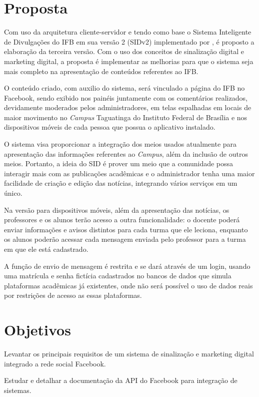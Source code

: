 \section{Proposta}
Com uso da arquitetura cliente-servidor e tendo como base o Sistema Inteligente de Divulgações do IFB em sua versão 2 (SIDv2) implementado por \citet{sobrinho2017}, é proposto a elaboração da terceira versão. Com o uso dos conceitos de sinalização digital e marketing digital, a proposta é implementar as melhorias para que o sistema seja mais completo na apresentação de conteúdos referentes ao IFB. 

O conteúdo criado, com auxilio do sistema, será vinculado a página do IFB no Facebook, sendo exibido nos painéis juntamente com os comentários realizados, devidamente moderados pelos administradores, em telas espalhadas em locais de maior movimento no \textit{Campus} Taguatinga do Instituto Federal de Brasília e nos dispositivos móveis de cada pessoa que possua o aplicativo instalado. 

O sistema visa proporcionar a integração dos meios usados atualmente para apresentação das informações referentes ao \textit{Campus}, além da inclusão de outros meios. Portanto, a ideia do SID é prover um meio que a comunidade possa interagir mais com as publicações acadêmicas e o administrador tenha uma maior facilidade de criação e edição das notícias, integrando vários serviços em um único.

Na versão para dispositivos móveis, além da apresentação das notícias, os professores e os alunos terão acesso a outra funcionalidade: o docente poderá enviar informações e avisos distintos para cada turma que ele leciona, enquanto os alunos poderão acessar cada mensagem enviada pelo professor para a turma em que ele está cadastrado.

A função de envio de mensagem é restrita e se dará através de um login, usando uma matrícula e senha fictícia cadastrados no bancos de dados que simula plataformas acadêmicas já existentes, onde não será possível o uso de dados reais por restrições de acesso as essas plataformas.

\section{Objetivos}
Levantar os principais requisitos de um sistema de sinalização e marketing digital integrado a rede social Facebook.

Estudar e detalhar a documentação da API do Facebook para integração de sistemas.

